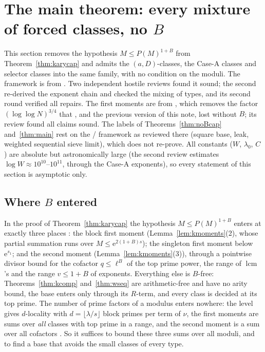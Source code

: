\documentclass[10pt,reqno]{amsart}
\theoremstyle{definition}
\theoremstyle{remark}
\newcommand{\lcm}{\operatorname{lcm}}
\newcommand{\e}{\mathrm e}
\begin{document}
\section{The main theorem: every mixture of forced classes, no \texorpdfstring{$B$}{B}}\label{sec:noB}

This section removes the hypothesis $M\leq P(M)^{1+B}$ from
Theorem~\ref{thm:karycap} and admits the $(a,D)$-classes, the Case-A
classes and selector classes into the same family, with no condition on
the moduli.  The framework is from \cite{KA2}.  Two independent hostile
reviews \cite{KA2rev,KA2rev2} found it sound; the second
re-derived the exponent chain and checked the mixing of types, and its
second round verified all repairs.  The first moments are from
\cite{KA3}, which removes the factor $(\log\log N)^{3/4}$ that \cite{KA2},
and the previous version of this note, lost without $B$; its review
\cite{KA3rev} found all claims sound.  The labels of
Theorems~\ref{thm:noBcap} and~\ref{thm:main} rest on the \cite{KA2}/\cite{KA}
framework as reviewed there (square base, leak, weighted sequential
sieve limit), which \cite{KA3} does not re-prove.  All constants ($W$, $\lambda_0$, $C$)
are absolute but astronomically large (the second review estimates
$\log W\approx10^{10}$--$10^{11}$, through the Case-A exponents), so every
statement of this section is asymptotic only.

\subsection{Where \texorpdfstring{$B$}{B} entered}
In the proof of Theorem~\ref{thm:karycap} the hypothesis
$M\leq P(M)^{1+B}$ enters at exactly three places \cite[\S1]{KA2}: the
block first moment (Lemma~\ref{lem:kmoments}(2), whose partial summation
runs over $M\leq\e^{2(1+B)s}$); the singleton first moment below
$\e^{s_1}$; and the second moment (Lemma~\ref{lem:kmoments}(3)), through
a pointwise divisor bound for the cofactor $q\leq\ell^B$ of the top prime
power, the range of $\lcm$'s and the range $v\leq1+B$ of exponents.
Everything else is $B$-free: Theorems~\ref{thm:kcomp} and~\ref{thm:wseq}
are arithmetic-free and have no arity bound, the base enters only
through its $R$-term, and every class is decided at its top prime.  The
number of prime factors of a modulus enters nowhere: the level gives
$d$-locality with $d=\lfloor\lambda/s\rfloor$ block primes per term of
$\nu$, the first moments are sums over \emph{all} classes with top prime in
a range, and the second moment is a sum over all cofactors
\cite[Remark~5.3]{KA2}.  So it suffices to bound these three sums over
all moduli, and to find a base that avoids the small classes of every
type.
\end{document}
